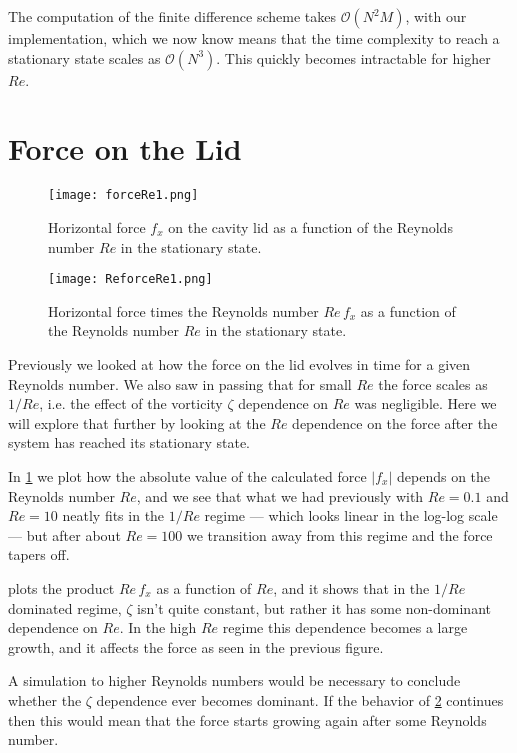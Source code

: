 \documentclass[10pt,a4paper,twocolumn]{article}
\begin{document}
The computation of the finite difference scheme takes $\mathcal{O}(N^2 M)$, with our implementation, which we now know means that the time complexity to reach a stationary state scales as $\mathcal{O}(N^3)$. This quickly becomes intractable for higher $Re$.

\section{Force on the Lid}

\begin{figure}[!b]
    \centering
    \texttt{[image: forceRe1.png]}
    \caption{Horizontal force $f_x$ on the cavity lid as a function of the Reynolds number $Re$ in the stationary state.}
    \label{fig:forceRe}
\end{figure}

\begin{figure}[!b]
    \centering
    \texttt{[image: ReforceRe1.png]}
    \caption{Horizontal force times the Reynolds number $Re \, f_x$ as a function of the Reynolds number $Re$ in the stationary state.}
    \label{fig:ReforceRe}
\end{figure}

Previously we looked at how the force on the lid evolves in time for a given Reynolds number. We also saw in passing that for small $Re$ the force scales as $1/Re$, i.e. the effect of the vorticity $\zeta$ dependence on $Re$ was negligible. Here we will explore that further by looking at the $Re$ dependence on the force after the system has reached its stationary state.

In \cref{fig:forceRe} we plot how the absolute value of the calculated force $|f_x|$ depends on the Reynolds number $Re$, and we see that what we had previously with $Re=0.1$ and $Re=10$ neatly fits in the $1/Re$ regime --- which looks linear in the log-log scale --- but after about $Re=100$ we transition away from this regime and the force tapers off.

 plots the product $Re \, f_x$ as a function of $Re$, and it shows that in the $1/Re$ dominated regime, $\zeta$ isn't quite constant, but rather it has some non-dominant dependence on $Re$. In the high $Re$ regime this dependence becomes a large growth, and it affects the force as seen in the previous figure.

A simulation to higher Reynolds numbers would be necessary to conclude whether the $\zeta$ dependence ever becomes dominant. If the behavior of \cref{fig:ReforceRe} continues then this would mean that the force starts growing again after some Reynolds number.
\end{document}
